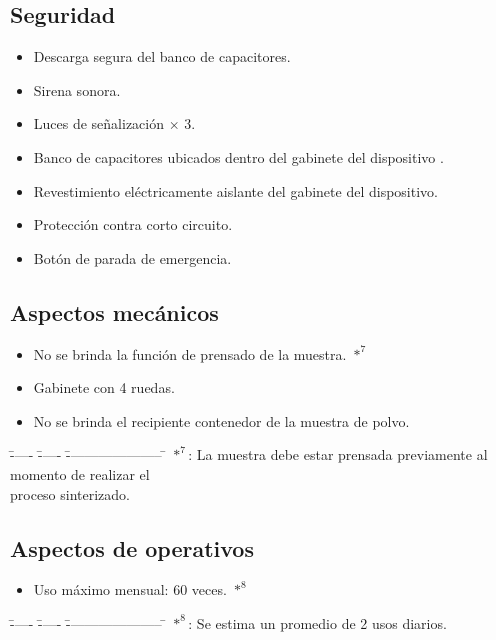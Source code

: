 \documentclass[12pt]{article}
\begin{document}
    \subsection{Seguridad}
      \begin{itemize}
	\item Descarga segura del banco de capacitores.
	\item Sirena sonora.
	\item Luces de señalización $\times$ 3.
	\item Banco de capacitores ubicados dentro del gabinete del dispositivo .
	\item Revestimiento eléctricamente aislante del gabinete del dispositivo.
	\item Protección contra corto circuito.
	\item Botón de parada de emergencia.
      \end{itemize}

    \subsection{Aspectos mecánicos}
      \begin{itemize}
	\item No se brinda la función de prensado de la muestra. $*^{7}$
	\item Gabinete con 4 ruedas. 
	\item No se brinda el recipiente contenedor de la muestra de polvo.
      \end{itemize}

      \begin{tabbing}
       \= ----- \= ----- \= --------------------- \= \kill
	\> $*^{7}$: \>  La muestra debe estar prensada previamente al momento de realizar el \\
	    \>\>	proceso sinterizado.\\
      \end{tabbing}

    \subsection{Aspectos de operativos}
      \begin{itemize}
	\item Uso máximo mensual: 60 veces. $*^{8}$
      \end{itemize}
    
      \begin{tabbing}
	\= ----- \= ----- \= --------------------- \= \kill
	\> $*^{8}$: \>Se estima un promedio de 2 usos diarios. \\
      \end{tabbing}
\end{document}
